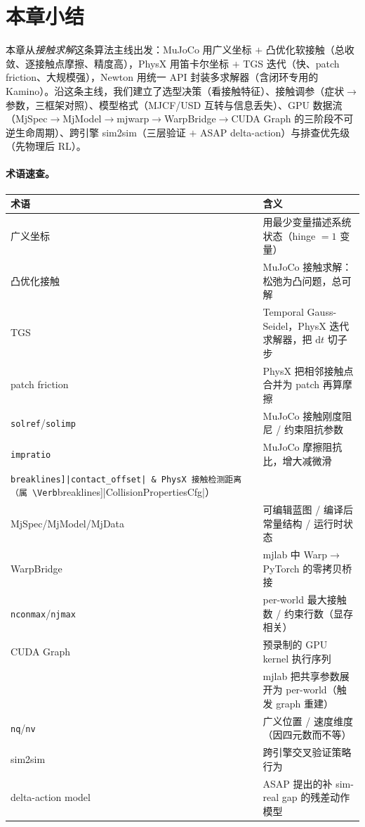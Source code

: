 \section*{本章小结}
\label{sec:rlmc-phys-summary}

本章从\emph{接触求解}这条算法主线出发：MuJoCo 用广义坐标 $+$ 凸优化软接触（总收敛、逐接触点摩擦、精度高），PhysX 用笛卡尔坐标 $+$ TGS 迭代（快、patch friction、大规模强），Newton 用统一 API 封装多求解器（含闭环专用的 Kamino）。沿这条主线，我们建立了选型决策（看接触特征）、接触调参（症状$\to$参数，三框架对照）、模型格式（MJCF/USD 互转与信息丢失）、GPU 数据流（MjSpec$\to$MjModel$\to$mjwarp$\to$WarpBridge$\to$CUDA Graph 的三阶段不可逆生命周期）、跨引擎 sim2sim（三层验证 $+$ ASAP delta-action）与排查优先级（先物理后 RL）。

\paragraph{术语速查。}

\begin{center}
\small
\begin{tabular}{@{}lp{8.6cm}@{}}
\toprule
术语 & 含义 \\
\midrule
广义坐标 & 用最少变量描述系统状态（hinge $=1$ 变量） \\
凸优化接触 & MuJoCo 接触求解：松弛为凸问题，总可解 \\
TGS & Temporal Gauss-Seidel，PhysX 迭代求解器，把 $\mathrm dt$ 切子步 \\
patch friction & PhysX 把相邻接触点合并为 patch 再算摩擦 \\
\verb|solref|/\allowbreak\verb|solimp| & MuJoCo 接触刚度阻尼 / 约束阻抗参数 \\
\verb|impratio| & MuJoCo 摩擦阻抗比，增大减微滑 \\
\Verb[breaklines]|contact_offset| & PhysX 接触检测距离（属 \Verb[breaklines]|CollisionPropertiesCfg|） \\
MjSpec/MjModel/MjData & 可编辑蓝图 / 编译后常量结构 / 运行时状态 \\
WarpBridge & mjlab 中 Warp$\to$PyTorch 的零拷贝桥接 \\
\verb|nconmax|/\allowbreak\verb|njmax| & per-world 最大接触数 / 约束行数（显存相关） \\
CUDA Graph & 预录制的 GPU kernel 执行序列 \\
\Verb[breaklines]|expand_model_fields| & mjlab 把共享参数展开为 per-world（触发 graph 重建） \\
\verb|nq|/\allowbreak\verb|nv| & 广义位置 / 速度维度（因四元数而不等） \\
sim2sim & 跨引擎交叉验证策略行为 \\
delta-action model & ASAP 提出的补 sim-real gap 的残差动作模型 \\
\bottomrule
\end{tabular}
\end{center}

